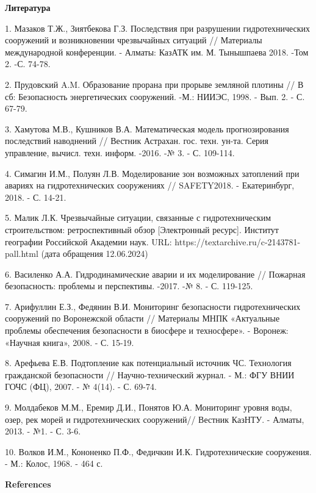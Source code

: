 \begin{center}
{\bfseries Литература}
\end{center}

\begin{noparindent}
1.
  Мазаков Т.Ж., Зиятбекова Г.З. Последствия при разрушении
  гидротехнических сооружений и возникновении чрезвычайных ситуаций //
  Материалы международной конференции. - Алматы: КазАТК им. М.
  Тынышпаева 2018. -Том 2. -С. 74-78.

2.
  Прудовский A.M. Образование прорана при прорыве земляной плотины // В
  сб: Безопасность энергетических сооружений. -М.: НИИЭС, 1998. - Вып.
  2. - С. 67-79.

3.
  Хамутова М.В., Кушников В.А. Математическая модель прогнозирования
  последствий наводнений // Вестник Астрахан. гос. техн. ун-та. Серия
  управление, вычисл. техн. информ. -2016. -№ 3. - С. 109-114.

4.
  Симагин И.М., Полуян Л.В. Моделирование зон возможных затоплений при
  авариях на гидротехнических сооружениях // SAFETY2018. - Екатеринбург,
  2018. - С. 14-21.

5.
  Малик Л.К. Чрезвычайные ситуации, связанные с гидротехническим
  строительством: ретроспективный обзор {[}Электронный ресурс{]}.
  Институт географии Российской Академии наук. URL:
  https://textarchive.ru/c-2143781-pall.html (дата обращения 12.06.2024)

6.
  Василенко А.А. Гидродинамические аварии и их моделирование // Пожарная
  безопасность: проблемы и перспективы. -2017. -№ 8. - С. 119-125.

7.
  Арифуллин Е.З., Федянин В.И. Мониторинг безопасности гидротехнических
  сооружений по Воронежской области // Материалы МНПК «Актуальные
  проблемы обеспечения безопасности в биосфере и техносфере». - Воронеж:
  «Научная книга», 2008. - С. 15-19.

8.
  Арефьева Е.В. Подтопление как потенциальный источник ЧС. Технология
  гражданской безопасности // Научно-технический журнал. - М.: ФГУ ВНИИ
  ГОЧС (ФЦ), 2007. - № 4(14). - С. 69-74.

9.
  Молдабеков М.М., Еремир Д.И., Понятов Ю.А. Мониторинг уровня воды,
  озер, рек морей и гидротехнических сооружений// Вестник КазНТУ. -
  Алматы, 2013. - №1. - С. 3-6.

10.
  Волков И.М., Кононенко П.Ф., Федичкин И.К. Гидротехнические
  сооружения. - М.: Колос, 1968. - 464 с.
\end{noparindent}

\begin{center}
{\bfseries References}
\end{center}

